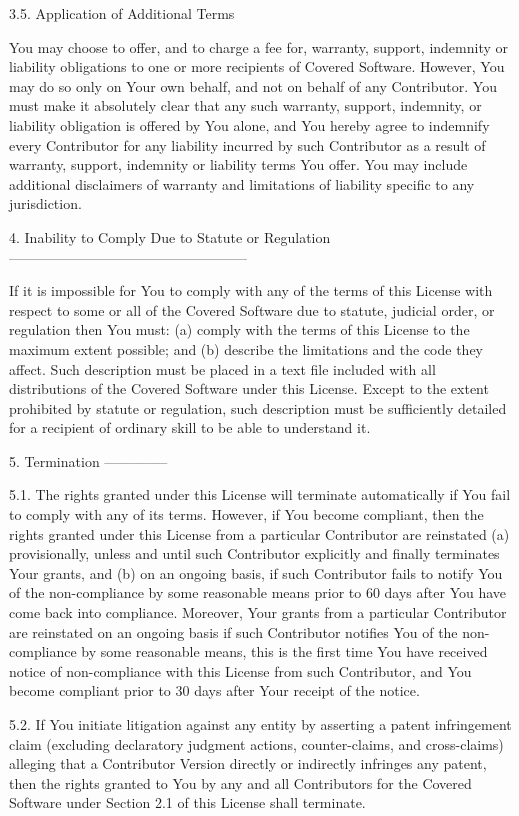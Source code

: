 3.5. Application of Additional Terms

You may choose to offer, and to charge a fee for, warranty, support,
indemnity or liability obligations to one or more recipients of Covered
Software. However, You may do so only on Your own behalf, and not on
behalf of any Contributor. You must make it absolutely clear that any
such warranty, support, indemnity, or liability obligation is offered by
You alone, and You hereby agree to indemnify every Contributor for any
liability incurred by such Contributor as a result of warranty, support,
indemnity or liability terms You offer. You may include additional
disclaimers of warranty and limitations of liability specific to any
jurisdiction.

4. Inability to Comply Due to Statute or Regulation
---------------------------------------------------

If it is impossible for You to comply with any of the terms of this
License with respect to some or all of the Covered Software due to
statute, judicial order, or regulation then You must: (a) comply with
the terms of this License to the maximum extent possible; and (b)
describe the limitations and the code they affect. Such description must
be placed in a text file included with all distributions of the Covered
Software under this License. Except to the extent prohibited by statute
or regulation, such description must be sufficiently detailed for a
recipient of ordinary skill to be able to understand it.

5. Termination
--------------

5.1. The rights granted under this License will terminate automatically
if You fail to comply with any of its terms. However, if You become
compliant, then the rights granted under this License from a particular
Contributor are reinstated (a) provisionally, unless and until such
Contributor explicitly and finally terminates Your grants, and (b) on an
ongoing basis, if such Contributor fails to notify You of the
non-compliance by some reasonable means prior to 60 days after You have
come back into compliance. Moreover, Your grants from a particular
Contributor are reinstated on an ongoing basis if such Contributor
notifies You of the non-compliance by some reasonable means, this is the
first time You have received notice of non-compliance with this License
from such Contributor, and You become compliant prior to 30 days after
Your receipt of the notice.

5.2. If You initiate litigation against any entity by asserting a patent
infringement claim (excluding declaratory judgment actions,
counter-claims, and cross-claims) alleging that a Contributor Version
directly or indirectly infringes any patent, then the rights granted to
You by any and all Contributors for the Covered Software under Section
2.1 of this License shall terminate.

